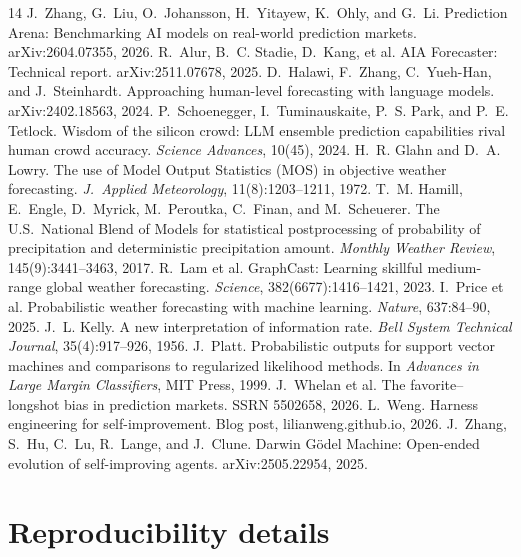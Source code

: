 \documentclass[sigconf,review,anonymous]{acmart}
\begin{document}
\begin{thebibliography}{14}
 J.~Zhang, G.~Liu, O.~Johansson, H.~Yitayew, K.~Ohly, and
G.~Li. Prediction Arena: Benchmarking AI models on real-world prediction
markets. arXiv:2604.07355, 2026.
 R.~Alur, B.~C. Stadie, D.~Kang, et al. AIA Forecaster:
Technical report. arXiv:2511.07678, 2025.
 D.~Halawi, F.~Zhang, C.~Yueh-Han, and J.~Steinhardt.
Approaching human-level forecasting with language models. arXiv:2402.18563, 2024.
 P.~Schoenegger, I.~Tuminauskaite, P.~S. Park, and
P.~E. Tetlock. Wisdom of the silicon crowd: LLM ensemble prediction
capabilities rival human crowd accuracy. \emph{Science Advances}, 10(45), 2024.
 H.~R. Glahn and D.~A. Lowry. The use of Model Output
Statistics (MOS) in objective weather forecasting. \emph{J.\ Applied
Meteorology}, 11(8):1203--1211, 1972.
 T.~M. Hamill, E.~Engle, D.~Myrick, M.~Peroutka, C.~Finan, and
M.~Scheuerer. The U.S.\ National Blend of Models for statistical
postprocessing of probability of precipitation and deterministic
precipitation amount. \emph{Monthly Weather Review}, 145(9):3441--3463, 2017.
 R.~Lam et al. GraphCast: Learning skillful medium-range global
weather forecasting. \emph{Science}, 382(6677):1416--1421, 2023.
 I.~Price et al. Probabilistic weather forecasting with machine
learning. \emph{Nature}, 637:84--90, 2025.
 J.~L. Kelly. A new interpretation of information rate.
\emph{Bell System Technical Journal}, 35(4):917--926, 1956.
 J.~Platt. Probabilistic outputs for support vector machines and
comparisons to regularized likelihood methods. In \emph{Advances in Large
Margin Classifiers}, MIT Press, 1999.
 J.~Whelan et al. The favorite--longshot bias in prediction
markets. SSRN 5502658, 2026.
 L.~Weng. Harness engineering for self-improvement. Blog post,
lilianweng.github.io, 2026.
 J.~Zhang, S.~Hu, C.~Lu, R.~Lange, and J.~Clune. Darwin G\"odel
Machine: Open-ended evolution of self-improving agents. arXiv:2505.22954, 2025.
\end{thebibliography}

\appendix
\section{Reproducibility details}
\label{app:repro}
\end{document}
